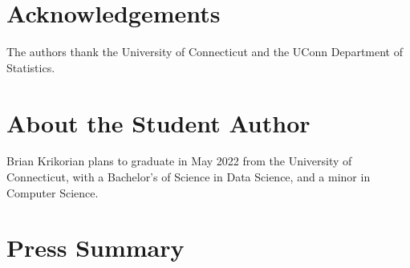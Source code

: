 \documentclass[12pt, titlepage]{article}
\begin{document}


\section*{Acknowledgements}
The authors thank the University of Connecticut and the UConn Department of Statistics.






\section*{About the Student Author}
Brian Krikorian plans to graduate in May 2022 from the University of Connecticut, with a Bachelor's of Science in Data Science, and a minor in Computer Science.

\section*{Press Summary}
\end{document}
